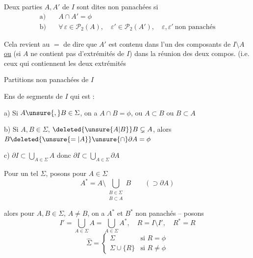Deux parties $A,A'$ de $I$ sont dites non panachées si
\[
\begin{aligned}
\text{a)}\quad &A\cap A'=\phi\\
\text{b)}\quad &\forall\,\varepsilon\in\mathcal{P}_2(A),\quad \varepsilon'\in\mathcal{P}_2(A'),\quad \varepsilon,\varepsilon'\ \text{non panachés}
\end{aligned}
\]

\reversemarginpar{}
Cela revient au $=$ de dire que $A'$ est contenu dans l'un des  composants de $I\setminus A$ \uline{ou} (si $A$ ne contient pas d'extrémités de $I$) dans la réunion des deux compos.   (i.e. ceux qui contiennent les deux extrémités

\normalmarginpar

Partitions non panachées de $I$

Ens \inserted{$\Sigma$} de segments de $I$ qui est :

a) Si $A\unsure{,}B\in\Sigma$, on a $A\cap B=\phi$, ou $A\subset B$ ou $B\subset A$

b) Si $A,B\in\Sigma$, $\deleted{\unsure{A|B}}B\subsetneq A$, alors $B\deleted{\unsure{=|A}}\unsure{\cap}\partial A=\phi$

c) \deleted{\unsure{$\forall$|$\forall\varepsilon$}} $\partial I\subset\bigcup\limits_{A\in\Sigma} A$ donc $\partial I\subset\bigcup\limits_{A\in\Sigma}\partial A$

Pour un tel $\Sigma$, posons pour $A\in\Sigma$
\[
A^{\ast}=A\setminus\bigcup_{\substack{B\in\Sigma\\B\subset A}} B \qquad (\supset\partial A)
\]

alors  pour $A,B\in\Sigma$, $A\ne B$, on a $A^{\ast}$ et $B^{\ast}$ non panachés -- posons   
\[
I'=\bigcup_{A\in\Sigma}A=\bigcup_{A\in\Sigma} A^{\ast},\quad R=I\setminus I',\quad R^{\ast}=R
\]
\[
\hat{\Sigma}=\begin{cases}
\Sigma &\text{si }R=\phi\\
\Sigma\cup\{R\} &\text{si }R\ne\phi
\end{cases}
\]

